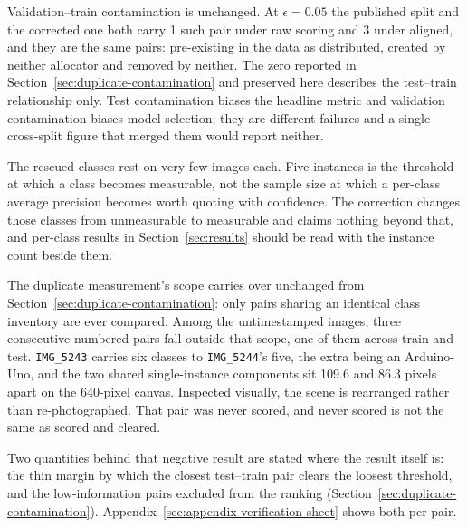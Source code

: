 Validation--train contamination is unchanged. At $\epsilon = 0.05$ the published
split and the corrected one both carry 1 such pair under raw scoring and 3 under
aligned, and they are the same pairs: pre-existing in the data as distributed,
created by neither allocator and removed by neither. The zero reported in
Section~\ref{sec:duplicate-contamination} and preserved here describes the
test--train relationship only. Test contamination biases the headline metric and
validation contamination biases model selection; they are different failures and
a single cross-split figure that merged them would report neither.

The rescued classes rest on very few images each. Five instances is the
threshold at which a class becomes measurable, not the sample size at which a
per-class average precision becomes worth quoting with confidence. The
correction changes those classes from unmeasurable to measurable and claims
nothing beyond that, and per-class results in Section~\ref{sec:results} should be
read with the instance count beside them.

The duplicate measurement's scope carries over unchanged from
Section~\ref{sec:duplicate-contamination}: only pairs sharing an identical class
inventory are ever compared. Among the untimestamped images, three
consecutive-numbered pairs fall outside that scope, one of them across train and
test. \texttt{IMG\_5243} carries six classes to \texttt{IMG\_5244}'s five, the
extra being an Arduino-Uno, and the two shared single-instance components sit
109.6 and 86.3 pixels apart on the 640-pixel canvas. Inspected visually, the
scene is rearranged rather than re-photographed. That pair was never scored, and
never scored is not the same as scored and cleared.

Two quantities behind that negative result are stated where the result itself
is: the thin margin by which the closest test--train pair clears the loosest
threshold, and the low-information pairs excluded from the ranking
(Section~\ref{sec:duplicate-contamination}).
Appendix~\ref{sec:appendix-verification-sheet} shows both per pair.

